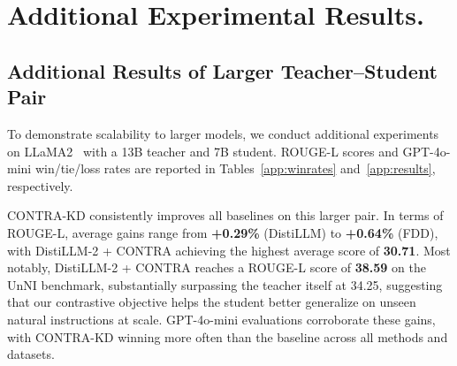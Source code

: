 \documentclass{article} %
\theoremstyle{definition}
\theoremstyle{remark}
\begin{document}
\section{Additional Experimental Results.}
\subsection{Additional Results of Larger Teacher--Student Pair}
\label{app:large_scale}
To demonstrate scalability to larger models, we conduct additional experiments on LLaMA2~\cite{touvron2023llamaopenefficientfoundation} with a 13B teacher and 7B student. ROUGE-L scores and GPT-4o-mini win/tie/loss rates are reported in Tables~\ref{app:winrates} and~\ref{app:results}, respectively.

CONTRA-KD consistently improves all baselines on this larger pair. In terms of ROUGE-L, average gains range from \textbf{+0.29\%} (DistiLLM) to \textbf{+0.64\%} (FDD), with DistiLLM-2 + CONTRA achieving the highest average score of \textbf{30.71}. Most notably, DistiLLM-2 + CONTRA reaches a ROUGE-L score of \textbf{38.59} on the UnNI benchmark, substantially surpassing the teacher itself at 34.25, suggesting that our contrastive objective helps the student better generalize on unseen natural instructions at scale. GPT-4o-mini evaluations corroborate these gains, with CONTRA-KD winning more often than the baseline across all methods and datasets.
\end{document}
